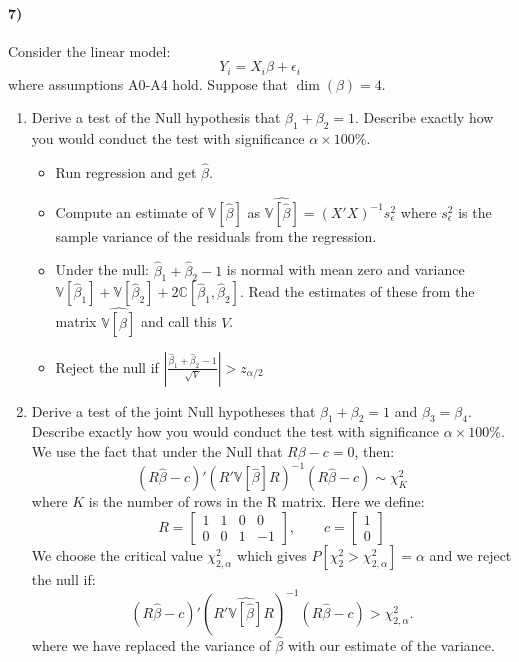 \documentclass[12pt]{article}
\newcommand\BB{\mathbb}
\newcommand\h{\hat}
\newcommand\eps{\epsilon}
\newcommand\barr{\begin{array}}
\newcommand\earr{\end{array}}
\numberwithin{equation}{section}
\numberwithin{figure}{section}
\numberwithin{table}{section}
\begin{document}
\paragraph{7)} Consider the linear model:
\[Y_i = X_i\beta + \eps_i\]
where assumptions A0-A4 hold. Suppose that $\dim(\beta)=4$.
\begin{enumerate}
\item Derive a test of the Null hypothesis that $\beta_1+\beta_2=1$. Describe exactly how you would conduct the test with significance $\alpha\times100\%$.
{\color{blue}
\begin{itemize}
\item Run regression and get $\hat{\beta}$.
\item Compute an estimate of $\BB{V}[\hat{\beta}]$ as $\widehat{\BB{V}[\hat{\beta}]} = (X'X)^{-1}s^2_\eps$ where $s^2_\eps$ is the sample variance of the residuals from the regression.
\item Under the null: $\h{\beta}_1+\hat{\beta}_2 - 1$ is normal with mean zero and variance $\BB{V}[\hat{\beta}_1] + \BB{V}[\hat{\beta}_2] + 2\BB{C}[\hat{\beta}_1,\hat{\beta}_2]$. Read the estimates of these from the matrix $\widehat{\BB{V}[\hat{\beta}]}$ and call this $V$.
\item Reject the null if $\left|\frac{\h{\beta}_1+\h{\beta}_2-1}{\sqrt{V}}\right|>z_{\alpha/2}$
\end{itemize}
}
\item Derive a test of the joint Null hypotheses that $\beta_1+\beta_2=1$ and $\beta_3=\beta_4$. Describe exactly how you would conduct the test with significance $\alpha\times100\%$. \\
{\color{blue}
We use the fact that under the Null that $R\beta - c = 0$, then:
\[ (R\hat{\beta}-c)'(R'\BB{V}[\hat{\beta}]R)^{-1}(R\hat{\beta}-c) \sim \chi^2_{K} \]
where $K$ is the number of rows in the R matrix. Here we define:
\[ R = \left[\barr{cccc}1 & 1 & 0 & 0 \\ 0 & 0 & 1 & -1 \earr\right],\qquad c=\left[\barr{c}1 \\ 0\earr\right] \]
We choose the critical value $\chi^2_{2,\alpha}$ which gives $P[\chi^2_2 >\chi^2_{2,\alpha}] = \alpha$ and we reject the null if:
\[ (R\hat{\beta}-c)'(R'\widehat{\BB{V}[\hat{\beta}]}R)^{-1}(R\hat{\beta}-c) > \chi^2_{2,\alpha}.\]
where we have replaced the variance of $\hat{\beta}$ with our estimate of the variance.
}

\end{enumerate}
\end{document}

